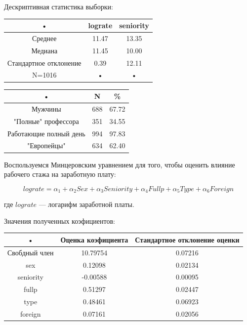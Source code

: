 \documentclass[a4paper, 12pt]{article}
\theoremstyle{definition}
\theoremstyle{plain}
\begin{document}
Дескриптивная статистика выборки:

\begin{center}
\begin{tabular}{|c|c|c|}
\hline 
• & lograte & seniority \\ 
\hline 
Среднее & 11.47 & 13.35 \\ 
\hline 
Медиана & 11.45 & 10.00 \\ 
\hline 
Стандартное отклонение & 0.39 & 12.11 \\ 
\hline 
N=1016 & • & • \\ 
\hline 
\end{tabular} 
\end{center}

\begin{center}
\begin{tabular}{|c|c|c|}
\hline 
• & N & \% \\ 
\hline 
Мужчины & 688 & 67.72 \\ 
\hline 
"Полные" профессора & 351 & 34.55 \\ 
\hline 
Работающие полный день & 994 & 97.83 \\ 
\hline 
"Европейцы" & 634 & 62.40 \\ 
\hline 
\end{tabular} 
\end{center}

Воспользуемся Минцеровским уравнением для того, чтобы оценить влияние рабочего стажа на заработную плату:

$$lograte=\alpha_1+\alpha_2 Sex+\alpha_3 Seniority +\alpha_4 Fullp+\alpha_5 Type +\alpha_6 Foreign$$

где $lograte$ --- логарифм заработной платы.

Значения полученных коэфициентов:

\begin{center}
\begin{tabular}{|c|c|c|}
\hline 
• & Оценка коэфициента & Стандартное отклонение оценки \\ 
\hline 
Свобдный член & 10.79754 & 0.07216 \\ 
\hline 
sex & 0.12098 & 0.02134 \\ 
\hline 
seniority & -0.00588 & 0.00095 \\ 
\hline 
fullp & 0.51297 & 0.02447 \\ 
\hline 
type & 0.48461 & 0.06923 \\ 
\hline 
foreign & 0.07161 & 0.02056 \\ 
\hline 
\end{tabular} 
\end{center}
\end{document}

